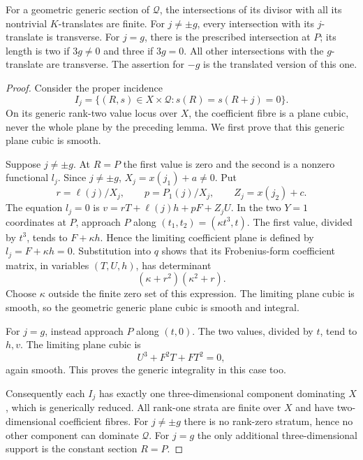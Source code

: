 \begin{lemma}
\label{lem:ss-contact-pair-covers}
For a geometric generic section of $\mathcal Q$, the intersections
of its divisor with all its nontrivial $K$-translates are finite.
For $j\ne\pm g$, every intersection with its $j$-translate is
transverse. For $j=g$, there is the prescribed intersection at $P$;
its length is two if $3g\ne0$ and three if $3g=0$. All other
intersections with the $g$-translate are transverse. The assertion
for $-g$ is the translated version of this one.
\end{lemma}
\begin{proof}
Consider the proper incidence
\[
 I_j=\{(R,s)\in X\times\mathcal Q:s(R)=s(R+j)=0\}.
\]
On its generic rank-two value locus over $X$, the coefficient fibre
is a plane cubic, never the whole plane by the preceding lemma.
We first prove that this generic plane cubic is smooth.

Suppose $j\ne\pm g$. At $R=P$ the first value is zero and the
second is a nonzero functional $l_j$. Since $j\ne\pm g$,
$X_j=x(j_1)+a\ne0$. Put
\[
 r=\ell(j)/X_j,\qquad p=P_1(j)/X_j,\qquad Z_j=x(j_2)+c.
\]
The equation $l_j=0$ is
$v=rT+\ell(j)h+pF+Z_jU$.
In the two $Y=1$ coordinates at $P$, approach $P$ along
$(t_1,t_2)=(\kappa t^3,t)$. The first value, divided by $t^3$,
tends to $F+\kappa h$. Hence the limiting coefficient plane is
defined by $l_j=F+\kappa h=0$. Substitution into $q$ shows that
its Frobenius-form coefficient matrix, in variables $(T,U,h)$,
has determinant
\begin{equation}\label{eq:ss-pair-plane-determinant}
                        (\kappa+r^2)(\kappa^2+r).
\end{equation}
Choose $\kappa$ outside the finite zero set of this expression.
The limiting plane cubic is smooth, so the geometric generic
plane cubic is smooth and integral.

For $j=g$, instead approach $P$ along $(t,0)$. The two values,
divided by $t$, tend to $h,v$. The limiting plane cubic is
\[
                           U^3+F^2T+FT^2=0,
\]
again smooth. This proves the generic integrality in this case too.

Consequently each $I_j$ has exactly one three-dimensional component
dominating $X$, which is generically reduced. All rank-one strata
are finite over $X$ and have two-dimensional coefficient fibres.
For $j\ne\pm g$ there is no rank-zero stratum, hence no other
component can dominate $\mathcal Q$. For $j=g$ the only additional
three-dimensional support is the constant section $R=P$.


\end{proof}
